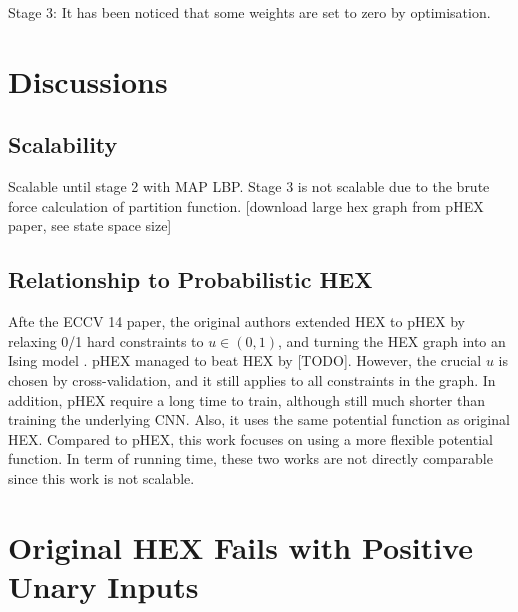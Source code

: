 \documentclass[11pt,a4paper]{article}
\begin{document}
Stage 3: It has been noticed that some weights are set to zero by optimisation.

\clearpage
\section{Discussions}
\subsection{Scalability}

Scalable until stage 2 with MAP LBP. Stage 3 is not scalable due to the brute force calculation of partition function. [download large hex graph from pHEX paper, see state space size]

\subsection{Relationship to Probabilistic HEX}

Afte the ECCV 14 paper, the original authors extended HEX to pHEX by relaxing 0/1 hard constraints to $u\in(0,1)$, and turning the HEX graph into an Ising model \cite{ding2015probabilistic}. pHEX managed to beat HEX by [TODO]. However, the crucial $u$ is chosen by cross-validation, and it still applies to all constraints in the graph. In addition, pHEX require a long time to train, although still much shorter than training the underlying CNN. Also, it uses the same potential function as original HEX. Compared to pHEX, this work focuses on using a more flexible potential function. In term of running time, these two works are not directly comparable since this work is not scalable.

\clearpage
\appendix
\section{Original HEX Fails with Positive Unary Inputs}
\label{sec:fail}
\end{document}

